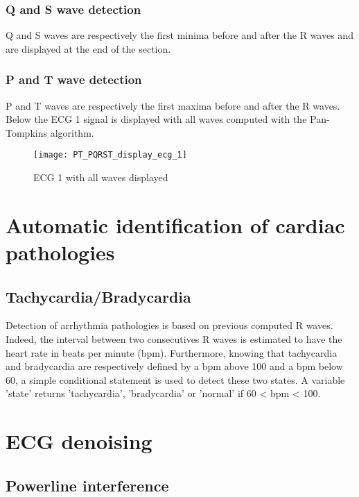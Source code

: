 \documentclass[11pt]{article}
\begin{document}
	\subsubsection{Q and S wave detection}
	
	Q and S waves are respectively the first minima before and after the R waves and are displayed at the end of the section.
	
	\subsubsection{P and T wave detection}
	
	P and T waves are respectively the first maxima before and after the R waves. Below the ECG 1 signal is displayed with all waves computed with the Pan-Tompkins algorithm.
	
    \begin{figure}[H]
	\centering
	\texttt{[image: PT\_PQRST\_display\_ecg\_1]}
	\caption{ECG 1 with all waves displayed}
	\end{figure} 
	
	\section{Automatic identification of cardiac pathologies}
	
	\subsection{Tachycardia/Bradycardia}
	
	Detection of arrhythmia pathologies is based on previous computed R waves. Indeed, the interval between two consecutives R waves is estimated to have the heart rate in beats per minute (bpm). Furthermore, knowing that tachycardia and bradycardia are respectively defined by a bpm above 100 and a bpm below 60, a simple conditional statement is used to detect these two states. A variable 'state' returns 'tachycardia', 'bradycardia' or 'normal' if 60 < bpm < 100.
	
	\section{ECG denoising}
	
	\subsection{Powerline interference}
	
\end{document}
